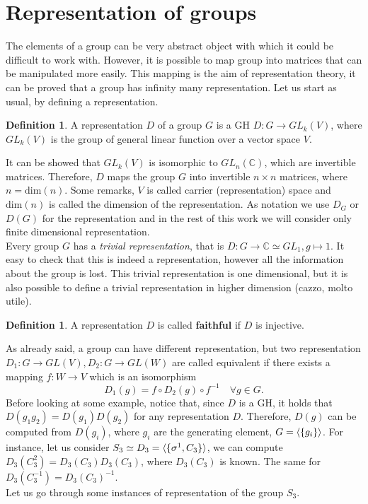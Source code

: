 \documentclass[12pt]{book}
\theoremstyle{plain}
\newcommand{\C}{\mathbb{C}}
\theoremstyle{definition}
\newtheorem{dfn}[thm]{Definition}
\theoremstyle{remark}
\begin{document}
\section{Representation of groups}
The elements of a group can be very abstract object with which it could be difficult to work with. However, it is possible to map group into matrices that can be manipulated more easily. This mapping is the aim of representation theory, it can be proved that a group has infinity many representation. Let us start as usual, by defining a representation.
\begin{dfn}
A representation $D$ of a group $G$ is a GH $D:G\to GL_k(V)$, where $GL_k(V)$ is the group of general linear function over a vector space $V$. 
\end{dfn} 
It can be showed that $GL_k(V)$ is isomorphic to $GL_n(\C)$, which are invertible matrices. Therefore, $D$ maps the group $G$ into invertible $n\times n$ matrices, where $n= \text{dim}(n)$.
Some remarks, $V$ is called carrier (representation) space and $\text{dim}(n)$ is called the dimension of the representation. As notation we use $D_G$ or $D(G)$ for the representation and in the rest of this work we will consider only finite dimensional representation. \\
Every group $G$ has a \emph{trivial representation}, that is $D:G\to \C \simeq GL_1,g\mapsto 1$. It easy to check that this is indeed a representation, however all the information about the group is lost. This trivial representation is one dimensional, but it is also possible to define a trivial representation in higher dimension (cazzo, molto utile).
\begin{dfn}
A representation $D$ is called \textbf{faithful} if $D$ is injective.
\end{dfn}
As already said, a group can have different representation, but two representation  $D_1:G\to GL(V),D_2:G\to GL(W)$ are called equivalent if there exists a mapping $f:W\to V$ which is an isomorphism
\[D_1(g) = f\circ D_2(g)\circ f^{-1}\quad \forall g\in G.\]
Before looking at some example, notice that, since $D$ is a GH, it holds that $D(g_1g_2)=D(g_1)D(g_2)$ for any representation $D$. Therefore, $D(g)$ can be computed from $D(g_i)$, where $g_i$ are the generating element, $G =\braket{\{g_i\}}$. For instance, let us consider $S_3 \simeq D_3 = \braket{\{\sigma^1,C_3\}}$, we can compute $D_3(C_3^2) = D_3(C_3)D_3(C_3)$, where $D_3(C_3)$ is known. The same for $D_3(C_3^{-1})=D_3(C_3)^{-1}$. \\
Let us go through some instances of representation of the group $S_3$.
\end{document}
